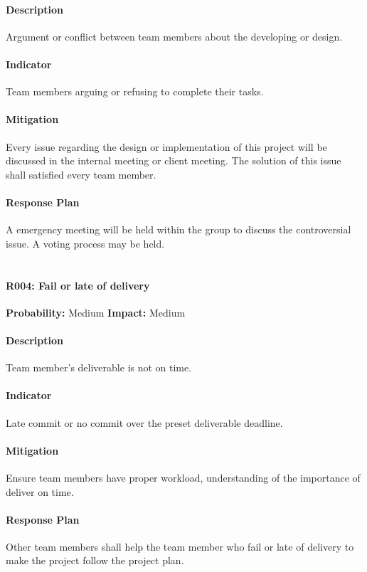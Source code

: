\documentclass[11pt, a4paper]{report}
\begin{document}
	\paragraph{Description}Argument or conflict between team members about the developing or design. 
	\paragraph{Indicator}Team members arguing or refusing to complete their tasks.
	\paragraph{Mitigation}Every issue regarding the design or implementation of this project will be discussed in the internal meeting or client meeting. The solution of this issue shall satisfied every team member.
	\paragraph{Response Plan}A emergency meeting will be held within the group to discuss the controversial issue. A voting process may be held.\\\\

	\paragraph{R004: Fail or late of delivery} \hspace{1cm} \textbf{Probability: }Medium\hspace{1cm}   \textbf{Impact: }Medium
	\paragraph{Description}Team member's deliverable is not on time.
	\paragraph{Indicator}Late commit or no commit over the preset deliverable deadline.
	\paragraph{Mitigation}Ensure team members have proper workload, understanding of the importance of deliver on time. 
	\paragraph{Response Plan}Other team members shall help the team member who fail or late of delivery to make the project follow the project plan. \\\\
\end{document}
